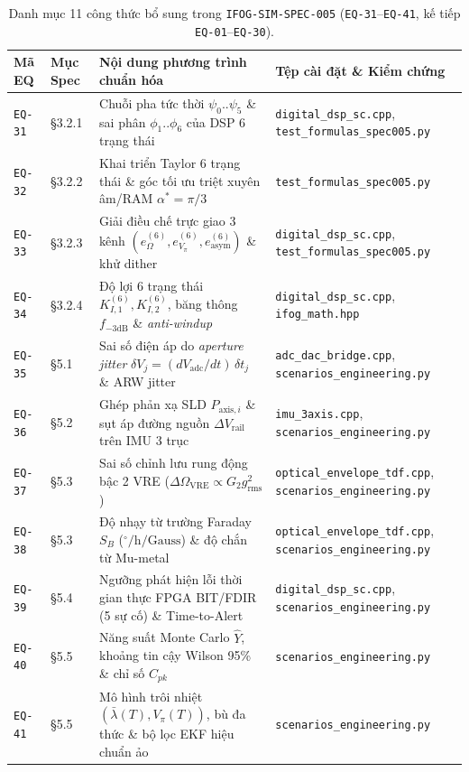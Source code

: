 \documentclass[11pt, a4paper]{article}
\begin{document}
\begin{table}[htbp]
\centering
\caption{Danh mục 11 công thức bổ sung trong \texttt{IFOG-SIM-SPEC-005} (\texttt{EQ-31}--\texttt{EQ-41}, kế tiếp \texttt{EQ-01}--\texttt{EQ-30}).}
\label{tab:eq31_41}
\footnotesize
\renewcommand{\arraystretch}{1.18}
\begin{tabular}{@{}L{1.5cm} L{2.0cm} L{7.4cm} L{4.6cm}@{}}
\toprule
\textbf{Mã EQ} & \textbf{Mục Spec} & \textbf{Nội dung phương trình chuẩn hóa} & \textbf{Tệp cài đặt \& Kiểm chứng} \\
\midrule
\texttt{EQ-31} & §3.2.1 & Chuỗi pha tức thời $\psi_0..\psi_5$ \& sai phân $\phi_1..\phi_6$ của DSP 6 trạng thái & \texttt{digital\_dsp\_sc.cpp}, \texttt{test\_formulas\_spec005.py} \\
\texttt{EQ-32} & §3.2.2 & Khai triển Taylor 6 trạng thái \& góc tối ưu triệt xuyên âm/RAM $\alpha^*=\pi/3$ & \texttt{test\_formulas\_spec005.py} \\
\texttt{EQ-33} & §3.2.3 & Giải điều chế trực giao 3 kênh $(e_\Omega^{(6)}, e_{V_\pi}^{(6)}, e_{\text{asym}}^{(6)})$ \& khử dither & \texttt{digital\_dsp\_sc.cpp}, \texttt{test\_formulas\_spec005.py} \\
\texttt{EQ-34} & §3.2.4 & Độ lợi 6 trạng thái $K_{I,1}^{(6)}, K_{I,2}^{(6)}$, băng thông $f_{-3\text{dB}}$ \& \emph{anti-windup} & \texttt{digital\_dsp\_sc.cpp}, \texttt{ifog\_math.hpp} \\
\texttt{EQ-35} & §5.1 & Sai số điện áp do \emph{aperture jitter} $\delta V_j = (dV_{\text{adc}}/dt)\,\delta t_j$ \& ARW jitter & \texttt{adc\_dac\_bridge.cpp}, \texttt{scenarios\_engineering.py} \\
\texttt{EQ-36} & §5.2 & Ghép phản xạ SLD $P_{\text{axis},i}$ \& sụt áp đường nguồn $\Delta V_{\text{rail}}$ trên IMU 3 trục & \texttt{imu\_3axis.cpp}, \texttt{scenarios\_engineering.py} \\
\texttt{EQ-37} & §5.3 & Sai số chỉnh lưu rung động bậc 2 VRE ($\Delta\Omega_{\text{VRE}} \propto G_2 g_{\text{rms}}^2$) & \texttt{optical\_envelope\_tdf.cpp}, \texttt{scenarios\_engineering.py} \\
\texttt{EQ-38} & §5.3 & Độ nhạy từ trường Faraday $S_B$ ($^\circ/\text{h}/\text{Gauss}$) \& độ chắn từ Mu-metal & \texttt{optical\_envelope\_tdf.cpp}, \texttt{scenarios\_engineering.py} \\
\texttt{EQ-39} & §5.4 & Ngưỡng phát hiện lỗi thời gian thực FPGA BIT/FDIR (5 sự cố) \& Time-to-Alert & \texttt{digital\_dsp\_sc.cpp}, \texttt{scenarios\_engineering.py} \\
\texttt{EQ-40} & §5.5 & Năng suất Monte Carlo $\hat{Y}$, khoảng tin cậy Wilson 95\% \& chỉ số $C_{pk}$ & \texttt{scenarios\_engineering.py} \\
\texttt{EQ-41} & §5.5 & Mô hình trôi nhiệt $(\bar{\lambda}(T), V_\pi(T))$, bù đa thức \& bộ lọc EKF hiệu chuẩn ảo & \texttt{scenarios\_engineering.py} \\
\bottomrule
\end{tabular}
\end{table}
\end{document}
